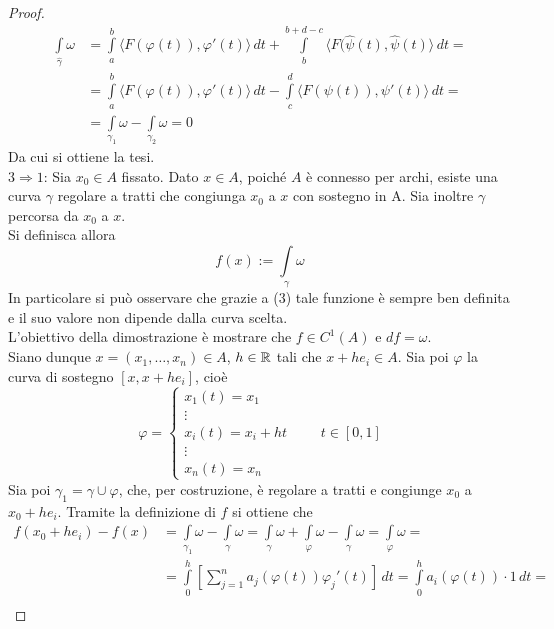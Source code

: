 \begin{proof}
\begin{equation}
\begin{aligned}
\int\limits_{\hat{{\gamma}}}{\omega} &= \int\limits_{a}^{b} \langle F(\varphi(t)), \varphi'(t)\rangle \, dt + \int\limits_{b}^{b+d-c}{\langle F(\hat{\psi}(t), \hat{\psi}(t) \rangle}\, dt=\\ 
&= \int\limits_{a}^{b} \langle F(\varphi(t)), \varphi'(t)\rangle \, dt - \int\limits_{c}^{d}{\langle F(\psi(t)), \psi'(t) \rangle}\, dt =\\
&= \int\limits_{\gamma_1}{\omega} - \int\limits_{\gamma_2}{\omega} = 0
\end{aligned}
\end{equation}
Da cui si ottiene la tesi.\\
$3 \Rightarrow 1$: Sia $x_0 \in A$ fissato. Dato $x \in A$, poiché $A$ è connesso per archi, esiste una curva $\gamma$ regolare a tratti che congiunga $x_0$ a $x$ con sostegno in A. Sia inoltre $\gamma$ percorsa da $x_0$ a $x$.\\
Si definisca allora
\begin{equation}
    f(x):=\int\limits_{\gamma}{\omega}
\end{equation}
In particolare si può osservare che grazie a (3) tale funzione è sempre ben definita e il suo valore non dipende dalla curva scelta.\\
L'obiettivo della dimostrazione è mostrare che $f \in C^1(A)$ e $df= \omega$.\\
Siano dunque $x=(x_1, \dots, x_n) \in A$, $h \in \mathbb{R}$ tali che $x+he_i \in A$. Sia poi $\varphi$ la curva di sostegno $[x, x+he_i]$, cioè
\begin{equation}
    \varphi= \begin{cases}
        x_1(t)=x_1\\
        \vdots\\
        x_i(t)=x_i+ht\\
        \vdots\\
        x_n(t)=x_n
    \end{cases}
    \qquad t \in [0,1]
\end{equation}
Sia poi $\gamma_1= \gamma \cup \varphi$, che, per costruzione, è regolare a tratti e congiunge $x_0$ a $x_0+he_i$. Tramite la definizione di $f$ si ottiene che
\begin{equation}
\begin{aligned}
    f(x_0+he_i)-f(x)&=\int\limits_{\gamma_1}{\omega}- \int\limits_{\gamma}{\omega}= \int\limits_{\gamma}{\omega}+\int\limits_{\varphi}{\omega}-\int\limits_{\gamma}{\omega}= \int\limits_{\varphi}{\omega}=\\
    &=\int\limits_{0}^{h}{\left[\sum\limits_{j=1}^{n}{a_j(\varphi(t))\varphi_j'(t)} \right] }\, dt=    \int\limits_{0}^{h}{a_i(\varphi(t))\cdot 1}\, dt =\\ 

\end{aligned}
\end{equation}
\end{proof}
